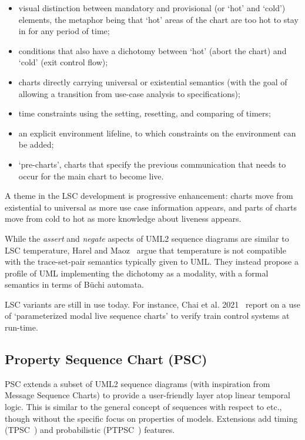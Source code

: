 \begin{itemize}
\item visual distinction between mandatory and provisional (or `hot'
  and `cold') elements, the metaphor being that `hot' areas of the
  chart are too hot to stay in for any period of time;
\item conditions that also have a dichotomy between `hot' (abort the
  chart) and `cold' (exit control flow);
\item charts directly carrying universal or existential semantics (with the
  goal of allowing a transition from use-case analysis to specifications);
\item time constraints using the setting, resetting, and comparing of timers;
\item an explicit environment lifeline, to which constraints on the
  environment can be added;
\item `pre-charts', charts that specify the previous communication
  that needs to occur for the main chart to become live.
\end{itemize}

A theme in the LSC development is progressive enhancement: charts move
from existential to universal as more use case information appears,
and parts of charts move from cold to hot as more knowledge about
liveness appears.

While the \emph{assert} and \emph{negate} aspects of UML2 sequence diagrams
are similar to LSC temperature, Harel and Maoz~\cite{Harel08-ModalSD} argue
that temperature is not compatible with the trace-set-pair semantics typically
given to UML.  They instead propose a profile of UML implementing the
dichotomy as a modality, with a formal semantics in terms of B\"uchi automata.

LSC variants are still in use today.  For instance,
Chai et al. 2021~\cite{Chai21-PMLSC} report on a use of `parameterized modal
live sequence charts' to verify train control systems at run-time.


\subsection{Property Sequence Chart (PSC)}

PSC extends a subset of UML2 sequence diagrams (with inspiration from
Message Sequence Charts) to provide a
user-friendly layer atop linear temporal logic.  This is
similar to the general concept of \langname{} sequences with respect to \tockcsp{}
etc., though without the
specific focus on properties of \robochart{} models.
Extensions add timing (TPSC~\cite{tpsc}) and
probabilistic (PTPSC~\cite{ptpsc}) features.

